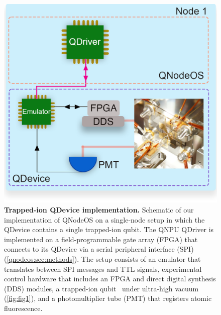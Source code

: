 \begin{figure}[htb]
\centering
\includegraphics[width=1\linewidth]{figures/qnodeos/main/fig5/fig5.png}
\caption{\textbf{Trapped-ion QDevice implementation.} Schematic of our implementation of QNodeOS on a single-node setup in which the QDevice contains a single trapped-ion qubit. The QNPU QDriver is implemented on a field-programmable gate array (FPGA) that connects to its QDevice via a serial peripheral interface (SPI) (\cref{qnodeos:sec:methods}). The setup consists of an emulator that translates between SPI messages and TTL signals, experimental control hardware that includes an FPGA and direct digital synthesis (DDS) modules, a trapped-ion qubit~\cite{teller2023integrating} under ultra-high vacuum (\cref{fig:fig1}), and a photomultiplier tube (PMT) that registers atomic fluorescence.}
\label{fig:fig5}
\end{figure}